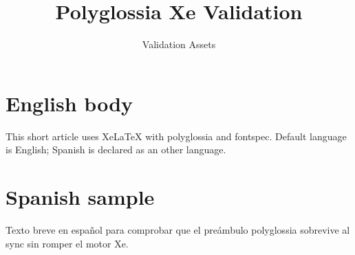 \documentclass{article}
\title{Polyglossia Xe Validation}
\author{Validation Assets}
\date{}
\begin{document}
\maketitle

\section{English body}
\label{sec:en}

This short article uses XeLaTeX with polyglossia and fontspec. Default
language is English; Spanish is declared as an other language.

\section{Spanish sample}
\label{sec:es}

\begin{spanish}
Texto breve en español para comprobar que el preámbulo polyglossia
sobrevive al sync sin romper el motor Xe.
\end{spanish}
\end{document}
